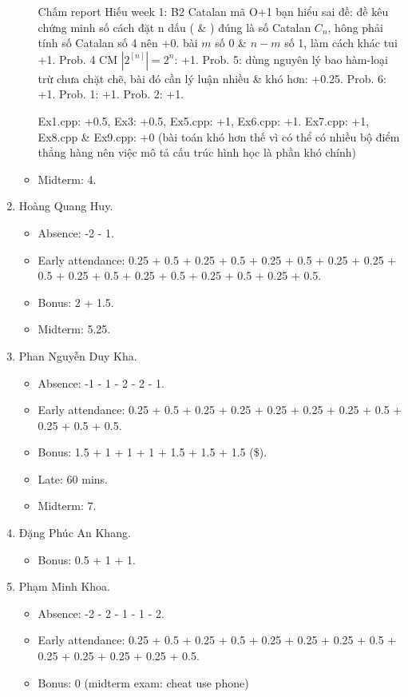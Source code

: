 \documentclass{article}
\begin{document}
\begin{enumerate}
\begin{itemize}
		Chấm report Hiếu week 1: B2 Catalan mã O+1 bạn hiểu sai đề: đề kêu chứng minh số cách đặt n dấu ( \& ) đúng là số Catalan $C_n$, hông phải tính số Catalan số 4 nên +0. bài $m$ số 0 \& $n - m$ số 1, làm cách khác tui +1. Prob. 4 CM $|2^{[n]}| =2^n$: +1. Prob. 5: dùng nguyên lý bao hàm-loại trừ chưa chặt chẽ, bài đó cần lý luận nhiều \& khó hơn: +0.25. Prob. 6: +1. Prob. 1: +1. Prob. 2: +1.

		Ex1.cpp: +0.5, Ex3: +0.5, Ex5.cpp: +1, Ex6.cpp: +1. Ex7.cpp: +1, Ex8.cpp \& Ex9.cpp: +0 (bài toán khó hơn thế vì có thể có nhiều bộ điểm thẳng hàng nên việc mô tả cấu trúc hình học là phần khó chính)
        \item Midterm: 4.
	\end{itemize}
	\item {\sc Hoàng Quang Huy.}
	\begin{itemize}
		\item Absence: -2 - 1.
		\item Early attendance: 0.25 + 0.5 + 0.25 + 0.5 + 0.25 + 0.5 + 0.25 + 0.25 + 0.5 + 0.25 + 0.5 + 0.25 + 0.5 + 0.25 + 0.5 + 0.25 + 0.5.
		\item Bonus: 2 + 1.5.
        \item Midterm: 5.25.
	\end{itemize}
	\item {\sc Phan Nguyễn Duy Kha.}
	\begin{itemize}
		\item Absence: -1 - 1 - 2 - 2 - 1.
		\item Early attendance: 0.25 + 0.5 + 0.25 + 0.25 + 0.25 + 0.25 + 0.25 + 0.5 + 0.25 + 0.5 + 0.5.
		\item Bonus: 1.5 + 1 + 1 + 1 + 1.5 + 1.5 + 1.5 (\$).
		\item Late: 60 mins.
        \item  Midterm: 7.
	\end{itemize}
	\item {\sc Đặng Phúc An Khang.}
	\begin{itemize}
		\item Bonus: 0.5 + 1 + 1.
	\end{itemize}
	\item {\sc Phạm Minh Khoa.}
	\begin{itemize}
		\item Absence: -2 - 2 - 1 - 1 - 2.
		\item Early attendance: 0.25 + 0.5 + 0.25 + 0.5 + 0.25 + 0.25 + 0.25 + 0.5 + 0.25 + 0.25 + 0.25 + 0.25 + 0.5.
		\item Bonus: 0 (midterm exam: cheat use phone)

\end{itemize}
\end{enumerate}
\end{document}
